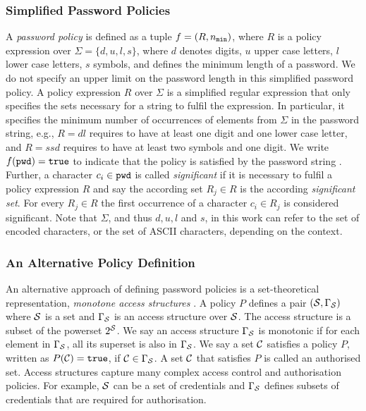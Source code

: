 \subsubsection{Simplified Password Policies}
A \emph{password policy} is defined as a tuple $f=(R,{n_\mathtt{min}})$, where $R$ is a policy expression over $\Sigma=\{d, u, l, s\}$, where $d$ denotes digits, $u$ upper case letters, $l$ lower case letters, $s$ symbols, and \pmin defines the minimum length of a password.
We do not specify an upper limit on the password length in this simplified password policy.
A policy expression $R$ over $\Sigma$ is a simplified regular expression that only specifies the sets necessary for a string to fulfil the expression.
In particular, it specifies the minimum number of occurrences of elements from $\Sigma$ in the password string, e.g., $R=dl$ requires \pwd to have at least one digit and one lower case letter, and $R=ssd$ requires \pwd to have at least two symbols and one digit.
We write $f(\mathtt{pwd})=\mathtt{true}$ to indicate that the policy is satisfied by the password string \pwd.
Further, a character $c_i\in\mathtt{pwd}$ is called \emph{significant} if it is necessary to fulfil a policy expression $R$ and say the according set $R_j\in R$ is the according \emph{significant set}.
For every $R_j\in R$ the first occurrence of a character $c_i\in R_j$ is considered significant.
Note that $\Sigma$, and thus $d,u,l$ and $s$, in this work can refer to the set of encoded characters, or the set of ASCII characters, depending on the context.

\subsubsection{An Alternative Policy Definition} \label{sec:lsss}
An alternative approach of defining password policies is a set-theoretical representation, \ie \emph{monotone access structures} \cite{ito89}.
A policy $P$ defines a pair $(\mathcal{S},\Gamma_\mathcal{S})$ where $\mathcal{S}$ is a set and $\Gamma_\mathcal{S}$ is an access structure over $\mathcal{S}$. 
The access structure is a subset of the powerset $2^\mathcal{S}$. 
We say an access structure $\Gamma_\mathcal{S}$ is monotonic if for each element in $\Gamma_\mathcal{S}$, all its superset is also in $\Gamma_\mathcal{S}$. 
We say a set $\mathcal{C}$ satisfies a policy $P$, written as $P(\mathcal{C})=\mathtt{true}$, if $\mathcal{C}\in \Gamma_\mathcal{S}$. 
A set $\mathcal{C}$ that satisfies $P$ is called an authorised set. 
Access structures capture many complex access control and authorisation policies. For example, $\mathcal{S}$ can be a set of credentials and $\Gamma_\mathcal{S}$ defines subsets of credentials that are required for authorisation.

